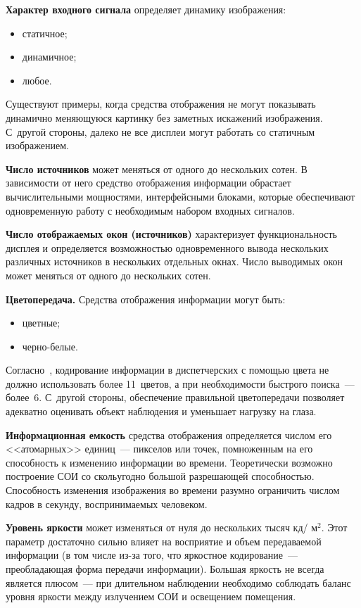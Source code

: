 \begin{multicols}{2}
     \textbf{Характер входного сигнала} определяет динамику 
изображения:
     \begin{itemize}
\item статичное;
\item динамичное;
\item любое.
\end{itemize}

Существуют примеры, когда средства отображения не могут показывать 
динамично меняющуюся картинку без заметных искажений изображения. 
С~другой стороны, далеко не все дисплеи могут работать со статичным 
изображением. 

     \textbf{Число источников} может меняться от одного до нескольких 
сотен. В зависимости от него средство отображения информации обрастает 
вычислительными мощностями, интерфейсными блоками, которые 
обеспечивают одновременную работу с необходимым набором входных 
сигналов. 
     
     \textbf{Число отображаемых окон (источников)} характеризует 
функциональность дисплея и определяется возможностью одновременного 
вывода нескольких различных источников в нескольких отдельных окнах. 
Число выводимых окон может меняться от одного до нескольких сотен. 

\textbf{Цветопередача.} Средства отображения информации могут быть:
\begin{itemize}
\item цветные;
\item черно-белые.
\end{itemize}

Согласно~\cite{15chu, 16chu}, кодирование информации в диспетчерских с 
помощью цвета не должно использовать более 11~цветов, а при 
необходимости быстрого поиска~--- более~6. С~другой стороны, 
обеспечение правильной цветопередачи позволяет адекватно оценивать 
объект наблюдения и уменьшает нагрузку на глаза.

     \textbf{Информационная емкость} средства отображения\linebreak 
определяется числом его <<атомарных>> единиц~--- пикселов или точек, 
помноженным на его способность к изменению информации во времени. 
Теоретически возможно построение СОИ со сколь\linebreak угодно большой 
разрешающей спо\-соб\-ностью. Спо\-соб\-ность изменения изображения во времени 
разумно ограничить числом кадров в секунду, воспринимаемых человеком. 
     
     \textbf{Уровень яркости} может изменяться от нуля до нескольких 
тысяч кд/ м$^2$. Этот параметр достаточно сильно влияет на восприятие и 
объем передаваемой информации (в том числе из-за того, что яркостное 
кодирование~--- преобладающая форма передачи информации). Большая 
яркость не всегда является плюсом~--- при длительном наблюдении 
необходимо соблюдать баланс уровня яркости между излучением СОИ и 
освещением помещения. 


\end{multicols}
